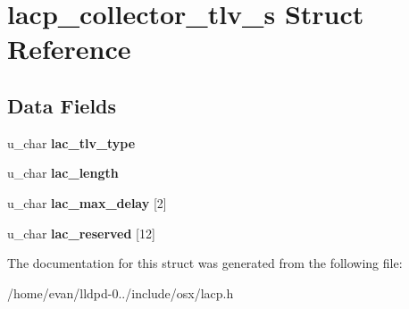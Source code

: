 \section{lacp\-\_\-collector\-\_\-tlv\-\_\-s \-Struct \-Reference}
\label{structlacp__collector__tlv__s}
\subsection*{\-Data \-Fields}
\begin{DoxyCompactItemize}
\item 
u\-\_\-char {\bfseries lac\-\_\-tlv\-\_\-type}\label{structlacp__collector__tlv__s_a8f146e680126f9854d0e6c6dc4bec257}

\item 
u\-\_\-char {\bfseries lac\-\_\-length}\label{structlacp__collector__tlv__s_a076b5f8b4b862986f8cc8212eecb0b2b}

\item 
u\-\_\-char {\bfseries lac\-\_\-max\-\_\-delay} [2]\label{structlacp__collector__tlv__s_ac366c70e20018ef684518c592e7da00d}

\item 
u\-\_\-char {\bfseries lac\-\_\-reserved} [12]\label{structlacp__collector__tlv__s_a70a02cd031a0449e6f9eacdae9212342}

\end{DoxyCompactItemize}


\-The documentation for this struct was generated from the following file\-:\begin{DoxyCompactItemize}
\item 
/home/evan/lldpd-\/0../include/osx/lacp.\-h\end{DoxyCompactItemize}
